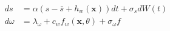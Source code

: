 \begin{align}
    ds &= \alpha(s-\bar{s}+h_w(\mathbf x)) dt + \sigma_s dW(t) \\
    d\omega &= \lambda_\omega + c_w f_w(\mathbf x,\theta) + \sigma_\omega f_\
\end{align}
